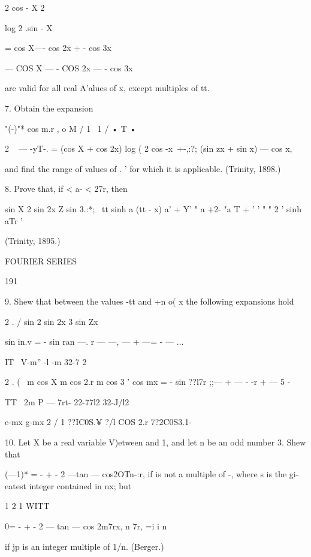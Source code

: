 {2 cos - X 
2 



log 2 .sin - X 



= cos X—- cos 2x + - cos 3x 



— COS X — - COS 2x — - cos 3x 



are valid for all real A'alues of x, except multiples of tt. 

7. Obtain the expansion 

"(-)"* cos m.r , o M /  1 \ 1 / • T • \ 

2 ~ — -yT-.   = (cos X + cos 2x) log ( 2 cos -x\ +-,:?; (sin zx + sin x) — cos x, 

and find the range of values of . ' for which it is applicable. (Trinity, 1898.) 

8. Prove that, if < a- < 27r, then 



sin X 2 sin 2x Z sin 3.:*; \  tt sinh a (tt - x) 
a'  + Y' "  a +2-  "a T  + ' ' " " 2 ' sinh aTr ' 



(Trinity, 1895.) 



FOURIER SERIES 



191 



9. Shew that between the values -tt and +n o( x the following expansions hold 

2 . / sin   2 sin 2x 3 sin Zx 

sin in.v = - sin ran —. r — —, —   + —= -  — ... 

IT \ V-m'' -l -m  32-7 2 

2 . ( \ m cos X m cos 2.r m cos 3 ' 
cos mx = - sin ??l7r ;;— + —  - -r  + — 5 -  

TT \ 2m P — 7rt- 22-77l2 32-J/l2 

e-mx g-mx  2 / 1 ??IC0S.¥ ?/l COS 2.r 7?2C0S3.1- \ 

10. Let X be a real variable V)etween and 1, and let n be an odd number   3. 
Shew that 

(—1)* = - + - 2 —tan — cos2OTn-:r, 
if   is not a multiple of -, where s is the gi-eatest integer contained in nx; but 

 1 2 1 WITT 

0= - + - 2 — tan — cos 2m7rx, 
n 7r, =i i n 

if jp is an integer multiple of 1/n. (Berger.) 

}
